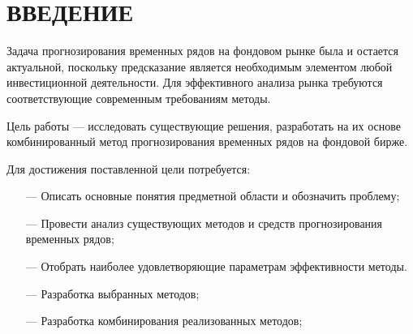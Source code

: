 \section*{ВВЕДЕНИЕ}

\par Задача прогнозирования временных рядов на фондовом рынке была и остается актуальной, поскольку предсказание является необходимым элементом любой инвестиционной деятельности. Для эффективного анализа рынка требуются соответствующие современным требованиям методы.

\par Цель работы --- исследовать существующие решения, разработать на их основе комбинированный метод прогнозирования временных рядов на фондовой бирже.

\par Для достижения поставленной цели потребуется:
\begin{itemize}[leftmargin=1.6\parindent]
    \item[---] Описать основные понятия предметной области и обозначить проблему;
	\item[---] Провести анализ существующих методов и средств прогнозирования временных рядов;
	\item[---] Отобрать наиболее удовлетворяющие параметрам эффективности методы.
	\item[---] Разработка выбранных методов;
	\item[---] Разработка комбинирования реализованных методов;
\end{itemize}

\pagebreak
